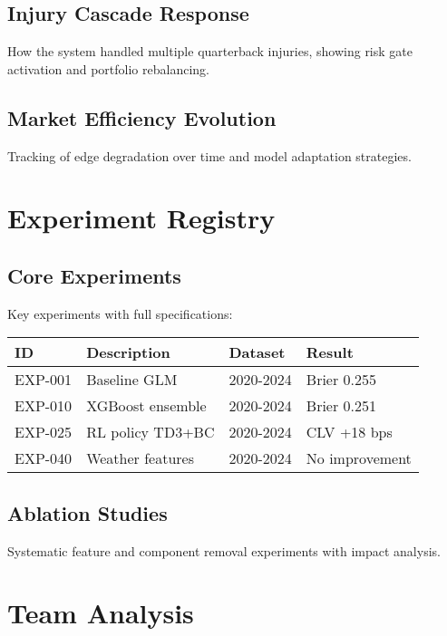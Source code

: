 \section{Injury Cascade Response}
How the system handled multiple quarterback injuries, showing risk gate activation and portfolio rebalancing.

\section{Market Efficiency Evolution}
Tracking of edge degradation over time and model adaptation strategies.

\chapter{Experiment Registry}

\section{Core Experiments}
Key experiments with full specifications:

\begin{table}[h]
\centering
\begin{tabular}{llll}
\toprule
\textbf{ID} & \textbf{Description} & \textbf{Dataset} & \textbf{Result} \\
\midrule
EXP-001 & Baseline GLM & 2020-2024 & Brier 0.255 \\
EXP-010 & XGBoost ensemble & 2020-2024 & Brier 0.251 \\
EXP-025 & RL policy TD3+BC & 2020-2024 & CLV +18 bps \\
EXP-040 & Weather features & 2020-2024 & No improvement \\
\bottomrule
\end{tabular}
\end{table}

\section{Ablation Studies}
Systematic feature and component removal experiments with impact analysis.

\chapter{Team Analysis}

